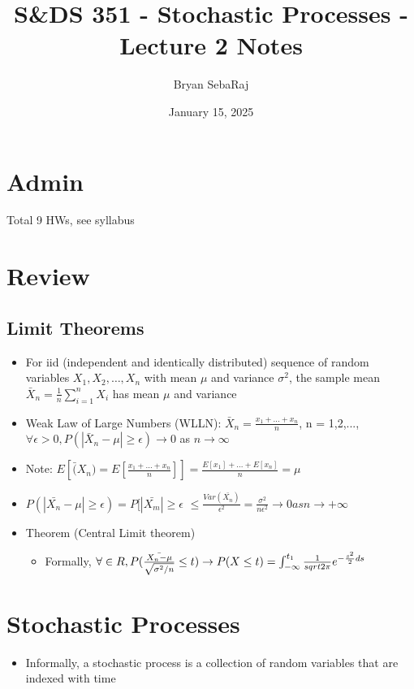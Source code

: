 \documentclass{article}
\title{S\&DS 351 - Stochastic Processes - Lecture 2 Notes}
\author{Bryan SebaRaj}
\date{January 15, 2025}
\begin{document}
\maketitle

\section{Admin}
Total 9 HWs, see syllabus

\section{Review}

\subsection{Limit Theorems} 
\begin{itemize} 
    \item For iid (independent and
    identically distributed) sequence of random variables $X_1, X_2, \ldots,
    X_n$ with mean $\mu$ and variance $\sigma^2$, the sample mean $\bar{X}_n =
    \frac{1}{n} \sum_{i=1}^{n} X_i$ has mean $\mu$ and variance
\item Weak Law of Large Numbers (WLLN): $\bar{X}_n = \frac{x_1+...+x_n}{n}$, n = 1,2,..., $\forall \epsilon > 0, P(|\bar{X}_n - \mu| \geq \epsilon) \rightarrow 0$ as $n \rightarrow \infty$
\item Note: $E[\bar(X_n)=E[\frac{x_1+...+x_n}{n}]] = \frac{E[x_1]+...+E[x_n]}{n} = \mu$
\item $P(|\bar{X_n}-\mu| \geq \epsilon)=P[|\bar{X_m} | \geq \epsilon$ $\leq \frac{Var(\bar{X_n})}{\epsilon^2}=\frac{\sigma^2}{n\epsilon^2}\rightarrow 0 as n \rightarrow + \infty$
\item Theorem (Central Limit theorem)
    \begin{itemize}
        \item Formally, $\forall \in R, P(\frac{\bar{X_n - \mu}}{\sqrt{\sigma^2/n}} \leq t) \rightarrow P(X \leq t)=\int_{-\infty}^{t_1}\frac{1}{\\sqrt{2\pi}}e^{-\frac{s^2}{2}ds}$ 
    \end{itemize}
\end{itemize}


\section{Stochastic Processes}
\begin{itemize}
    \item Informally, a stochastic process is a collection of random variables that are indexed with time
\end{itemize}
\end{document}
